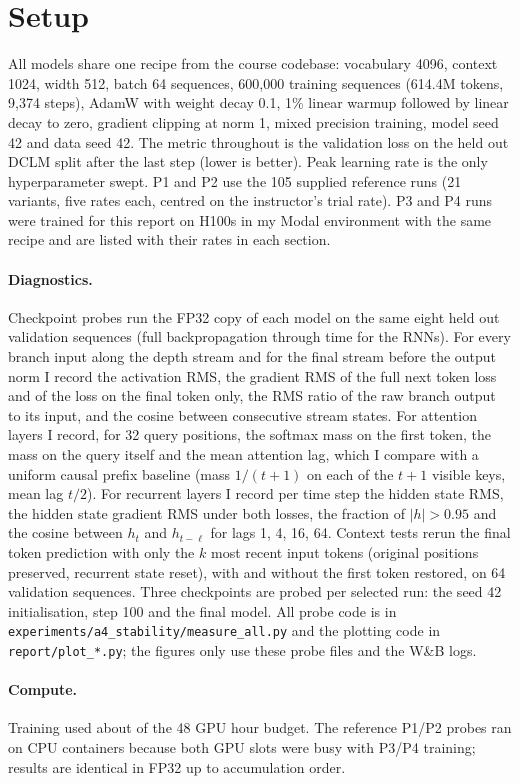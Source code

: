 \section{Setup}

All models share one recipe from the course codebase: vocabulary 4096, context 1024, width 512, batch 64 sequences, 600{,}000 training sequences (614.4M tokens, 9{,}374 steps), AdamW with weight decay 0.1, 1\% linear warmup followed by linear decay to zero, gradient clipping at norm 1, mixed precision training, model seed 42 and data seed 42. The metric throughout is the validation loss on the held out DCLM split after the last step (lower is better). Peak learning rate is the only hyperparameter swept. P1 and P2 use the 105 supplied reference runs (21 variants, five rates each, centred on the instructor's trial rate). P3 and P4 runs were trained for this report on H100s in my Modal environment with the same recipe and are listed with their rates in each section.

\paragraph{Diagnostics.} Checkpoint probes run the FP32 copy of each model on the same eight held out validation sequences (full backpropagation through time for the RNNs). For every branch input along the depth stream and for the final stream before the output norm I record the activation RMS, the gradient RMS of the full next token loss and of the loss on the final token only, the RMS ratio of the raw branch output to its input, and the cosine between consecutive stream states. For attention layers I record, for 32 query positions, the softmax mass on the first token, the mass on the query itself and the mean attention lag, which I compare with a uniform causal prefix baseline (mass $1/(t+1)$ on each of the $t+1$ visible keys, mean lag $t/2$). For recurrent layers I record per time step the hidden state RMS, the hidden state gradient RMS under both losses, the fraction of $|h|>0.95$ and the cosine between $h_t$ and $h_{t-\ell}$ for lags 1, 4, 16, 64. Context tests rerun the final token prediction with only the $k$ most recent input tokens (original positions preserved, recurrent state reset), with and without the first token restored, on 64 validation sequences. Three checkpoints are probed per selected run: the seed 42 initialisation, step 100 and the final model. All probe code is in \texttt{experiments/a4\_stability/measure\_all.py} and the plotting code in \texttt{report/plot\_*.py}; the figures only use these probe files and the W\&B logs.

\paragraph{Compute.} Training used about \budgethours{} of the 48 GPU hour budget. The reference P1/P2 probes ran on CPU containers because both GPU slots were busy with P3/P4 training; results are identical in FP32 up to accumulation order.
